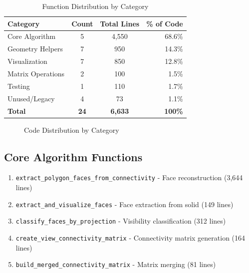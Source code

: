 \documentclass[11pt,a4paper]{article}
\begin{document}
\begin{table}[htbp]
\centering
\begin{tabular}{lccr}
\toprule
\textbf{Category} & \textbf{Count} & \textbf{Total Lines} & \textbf{\% of Code} \\
\midrule
Core Algorithm & 5 & 4,550 & 68.6\% \\
Geometry Helpers & 7 & 950 & 14.3\% \\
Visualization & 7 & 850 & 12.8\% \\
Matrix Operations & 2 & 100 & 1.5\% \\
Testing & 1 & 110 & 1.7\% \\
Unused/Legacy & 4 & 73 & 1.1\% \\
\midrule
\textbf{Total} & \textbf{24} & \textbf{6,633} & \textbf{100\%} \\
\bottomrule
\end{tabular}
\caption{Function Distribution by Category}
\label{tab:categories}
\end{table}

\begin{figure}[htbp]
\centering
{}
\caption{Code Distribution by Category}
\label{fig:pie_chart}
\end{figure}

\subsection{Core Algorithm Functions}
\begin{enumerate}
    \item \texttt{extract\_polygon\_faces\_from\_connectivity} - Face reconstruction (3,644 lines)
    \item \texttt{extract\_and\_visualize\_faces} - Face extraction from solid (149 lines)
    \item \texttt{classify\_faces\_by\_projection} - Visibility classification (312 lines)
    \item \texttt{create\_view\_connectivity\_matrix} - Connectivity matrix generation (164 lines)
    \item \texttt{build\_merged\_connectivity\_matrix} - Matrix merging (81 lines)
\end{enumerate}
\end{document}
